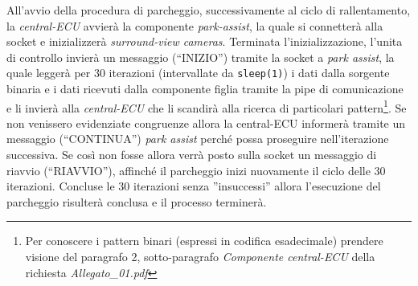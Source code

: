 \documentclass[11pt, openany]{article}
\theoremstyle{definition}
\theoremstyle{plain}
\theoremstyle{remark}
\begin{document}
	All'avvio della procedura di parcheggio, successivamente al ciclo di rallentamento, la \textit{central-ECU} avvierà la componente \textit{park-assist}, la quale si connetterà alla socket e inizializzerà \textit{surround-view cameras}. Terminata l'inizializzazione, l'unita di controllo invierà un messaggio (``INIZIO'') tramite la socket a \textit{park assist}, la quale leggerà per 30 iterazioni (intervallate da \texttt{sleep(1)}) i dati dalla sorgente binaria e i dati ricevuti dalla componente figlia tramite la pipe di comunicazione e li invierà alla \textit{central-ECU} che li scandirà alla ricerca di particolari pattern\footnote{Per conoscere i pattern binari (espressi in codifica esadecimale) prendere visione del paragrafo 2, sotto-paragrafo \textit{Componente central-ECU} della richiesta \textit{Allegato\_01.pdf}}. Se non venissero evidenziate congruenze allora la central-ECU informerà tramite un messaggio (``CONTINUA'') \textit{park assist} perché possa proseguire nell'iterazione successiva. Se così non fosse allora verrà posto sulla socket un messaggio di riavvio (``RIAVVIO''), affinché il parcheggio inizi nuovamente il ciclo delle 30 iterazioni. Concluse le 30 iterazioni senza ''insuccessi'' allora l'esecuzione del parcheggio risulterà conclusa e il processo terminerà.
	
\end{document}
